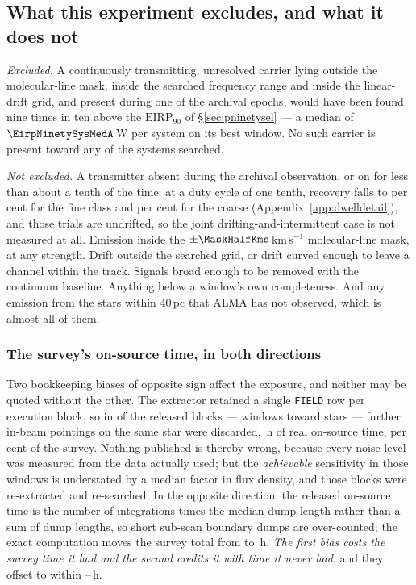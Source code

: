 \subsection{What this experiment excludes, and what it does not}
\label{sec:excludes}

\noindent\emph{Excluded.} A continuously transmitting, unresolved carrier
lying outside the molecular-line mask, inside the searched frequency range
and inside the linear-drift grid, and present during one of the archival
epochs, would have been found nine times in ten above the
$\mathrm{EIRP}_{90}$ of \S\ref{sec:pninetysel} --- a median of
$\EirpNinetySysMedA$\,W per system on its best window. No such carrier is
present toward any of the \NSystems{} systems searched.

\noindent\emph{Not excluded.} A transmitter absent during the archival
observation, or on for less than about a tenth of the time: at a duty cycle
of one tenth, recovery falls to \DwellFineT{} per cent for the fine class
and \DwellCoarseT{} per cent for the coarse
(Appendix~\ref{app:dwelldetail}), and those trials are undrifted, so the
joint drifting-and-intermittent case is not measured at all. Emission inside
the $\pm\MaskHalfKms$\,km\,s$^{-1}$ molecular-line mask, at any strength.
Drift outside the searched grid, or drift curved enough to leave a channel
within the track. Signals broad enough to be removed with the continuum
baseline. Anything below a window's own completeness. And any emission from
the \NGaiaCensus{} stars within 40\,pc that ALMA has not observed, which is
almost all of them.

\subsubsection{The survey's on-source time, in both directions}
\label{sec:exposure}

Two bookkeeping biases of opposite sign affect the exposure, and neither may
be quoted without the other. The extractor retained a single \texttt{FIELD}
row per execution block, so in \TruncNBlocks{} of the \ExpNBlocks{} released
blocks --- \TruncNWin{} windows toward \TruncNStars{} stars --- further
in-beam pointings on the same star were discarded, \TruncHoursLost\,h of
real on-source time, \TruncPctSurvey{} per cent of the survey. Nothing
published is thereby wrong, because every noise level was measured from the
data actually used; but the \emph{achievable} sensitivity in those windows
is understated by a median factor \TruncGainMed{} in flux density, and those
blocks were re-extracted and re-searched. In the opposite direction, the
released on-source time is the number of integrations times the median dump
length rather than a sum of dump lengths, so short sub-scan boundary dumps
are over-counted; the exact computation moves the survey total from
\OcOldMax{} to \OcNewMax\,h. \emph{The first bias costs the survey time it
had and the second credits it with time it never had}, and they offset to
within \ExpNetLo--\ExpNetHi\,h.

